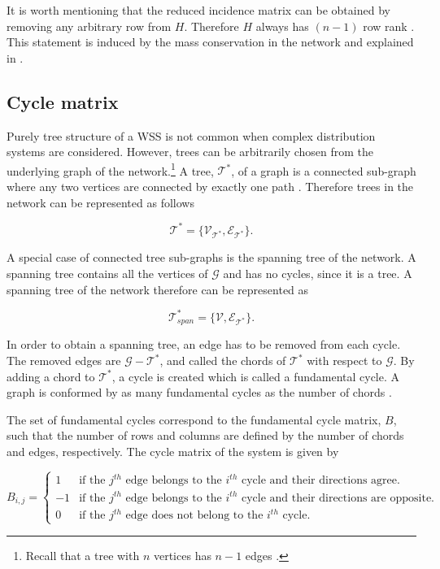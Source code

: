 It is worth mentioning that the reduced incidence matrix can be obtained by removing any arbitrary row from $H$. Therefore $H$ always has $(n-1)$ row rank \cite{deo2017graph}. This statement is induced by the mass conservation in the network and explained in .

\subsection{Cycle matrix}
\label{cycle_matrix}

Purely tree structure of a WSS is not common when complex distribution systems are considered. However, trees can be arbitrarily chosen from the underlying graph of the network.\footnote{Recall that a tree with $n$ vertices has $n-1$ edges \cite{deo2017graph}.}  A tree, $\mathcal{T}^* $, of a graph is a connected sub-graph where any two vertices are connected by exactly one path \cite{deo2017graph}. Therefore trees in the network can be represented as follows

\begin{equation}
  \label{Numberofchords}
  \mathcal{T}^* = \{\mathcal{V_{\mathcal{T}^*}}, \mathcal{E_{\mathcal{T}^*}} \}. 
\end{equation}

A special case of connected tree sub-graphs is the spanning tree of the network. A spanning tree contains all the vertices of $\mathcal{G}$ and has no cycles, since it is a tree. A spanning tree of the network therefore can be represented as

\begin{equation}
  \label{Numberofchords}
  \mathcal{T}^*_{span} = \{\mathcal{V}, \mathcal{E_{\mathcal{T}^*}} \}.
\end{equation}

In order to obtain a spanning tree, an edge has to be removed from each cycle. The removed edges are $\mathcal{G} - \mathcal{T}^*$, and called the chords of $\mathcal{T}^*$ with respect to $\mathcal{G}$. By adding a chord to $\mathcal{T}^*$, a cycle is created which is called a fundamental cycle. A graph is conformed by as many fundamental cycles as the number of chords \cite{deo2017graph}.

The set of fundamental cycles correspond to the fundamental cycle matrix, $B$, such that the number of rows and columns are defined by the number of chords and edges, respectively. The cycle matrix of the system is given by

\begin{equation}
\label{DiGraphCycle}
 B_{i,j} =
		\left\{
		\begin{array}{ll}
		
		1 			&     \text{if the $j^{th}$ edge belongs to the $i^{th}$ cycle and their directions agree.}	
\\
		-1          &     \text{if the $j^{th}$ edge belongs to the $i^{th}$ cycle and their directions are opposite.}
\\
        0           &     \text{if the $j^{th}$ edge does not belong to the $i^{th}$ cycle.}
		\end{array}
		\right.
\end{equation}	


